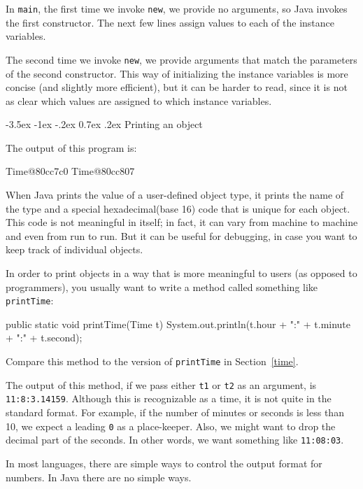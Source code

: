 \documentclass{book}
\makeatletter
\renewcommand{\section}{\@startsection 
    {section} {1} {0mm}%
    {-3.5ex \@plus -1ex \@minus -.2ex}%
    {0.7ex \@plus.2ex}%
    {\normalfont\Large\bfseries}}
\makeatother
\begin{document}
In {\tt main}, the first time we invoke {\tt new},
we provide no arguments, so Java invokes the first constructor.
The next few lines assign values to each of the instance
variables.

The second time we invoke {\tt new}, we provide
arguments that match the parameters of the second constructor.
This way of initializing the instance variables is more concise
(and slightly more efficient), but it can be harder to read, since
it is not as clear which values are assigned to which instance
variables.

\section{Printing an object}
\label{printobject}

The output of this program is:

\begin{verbatimtab}
Time@80cc7c0
Time@80cc807
\end{verbatimtab}
%
When Java prints the value of a user-defined object type, it prints
the name of the type and a special hexadecimal(base 16) code that is
unique for each object.  This code is not meaningful in itself; in
fact, it can vary from machine to machine and even from run to run.
But it can be useful for debugging, in case you want to keep track of
individual objects.

In order to print objects in a way that is more meaningful to users
(as opposed to programmers), you usually want to write a method
called something like {\tt printTime}:

\begin{verbatimtab}
  public static void printTime(Time t) {
    System.out.println(t.hour + ":" + t.minute + ":" + t.second);
  }
\end{verbatimtab}
%
Compare this method to the version of {\tt printTime} in
Section~\ref{time}.

The output of this method, if we pass either {\tt t1} or {\tt t2} as
an argument, is {\tt 11:8:3.14159}.  Although this is recognizable
as a time, it is not quite in the standard format.  For example, if
the number of minutes or seconds is less than 10, we expect a leading
{\tt 0} as a place-keeper.  Also, we might want to drop the decimal
part of the seconds.  In other words, we want something like
{\tt 11:08:03}.

In most languages, there are simple ways to control the output format
for numbers.  In Java there are no simple ways.
\end{document}
